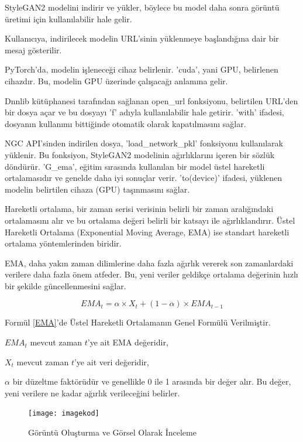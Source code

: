 \documentclass[12pt, a4paper]{article}
\begin{document}
	StyleGAN2 modelini indirir ve yükler, böylece bu model daha sonra görüntü üretimi için kullanılabilir hale gelir.
	
	Kullanıcıya, indirilecek modelin URL'sinin yüklenmeye başlandığına dair bir mesaj gösterilir.
	
	PyTorch'da, modelin işleneceği cihaz belirlenir. 'cuda', yani GPU, belirlenen cihazdır. Bu, modelin GPU üzerinde çalışacağı anlamına gelir.
	
	Dnnlib kütüphanesi tarafından sağlanan open\_url fonksiyonu, belirtilen URL'den bir dosya açar ve bu dosyayı 'f' adıyla kullanılabilir hale getirir. 'with' ifadesi, dosyanın kullanımı bittiğinde otomatik olarak kapatılmasını sağlar.
	
	NGC API'sinden indirilen dosya, 'load\_network\_pkl' fonksiyonu kullanılarak yüklenir. Bu fonksiyon, StyleGAN2 modelinin ağırlıklarını içeren bir sözlük döndürür. 'G\_ema', eğitim sırasında kullanılan bir model üstel hareketli ortalamasıdır ve genelde daha iyi sonuçlar verir. 'to(device)' ifadesi, yüklenen modelin belirtilen cihaza (GPU) taşınmasını sağlar.
	
	Hareketli ortalama, bir zaman serisi verisinin belirli bir zaman aralığındaki ortalamasını alır ve bu ortalama değeri belirli bir katsayı ile ağırlıklandırır. Üstel Hareketli Ortalama (Exponential Moving Average, EMA) ise standart hareketli ortalama yöntemlerinden biridir.
	
	EMA, daha yakın zaman dilimlerine daha fazla ağırlık vererek son zamanlardaki verilere daha fazla önem atfeder. Bu, yeni veriler geldikçe ortalama değerinin hızlı bir şekilde güncellenmesini sağlar.
	
	\begin{equation}
		EMA_t = \alpha \times X_t + (1-\alpha) \times EMA_{t-1}
		\label{EMA}
	\end{equation}
	
	Formül \eqref{EMA}'de Üstel Hareketli Ortalamanın Genel Formülü Verilmiştir\cite{ChatGPT-2024-05-29}.
	
	$EMA_t$ mevcut zaman $t$'ye ait EMA değeridir, 
	
	$X_t$ mevcut zaman $t$'ye ait veri değeridir,
	
	$\alpha$ bir düzeltme faktörüdür ve genellikle 0 ile 1 arasında bir değer alır. Bu değer, yeni verilere ne kadar ağırlık verileceğini belirler.
	
	\begin{figure}[h]
		\centering
		\texttt{[image: imagekod]}
		\label{imagekod}
		\caption{Görüntü Oluşturma ve Görsel Olarak İnceleme}
	\end{figure}
	\FloatBarrier
\end{document}
